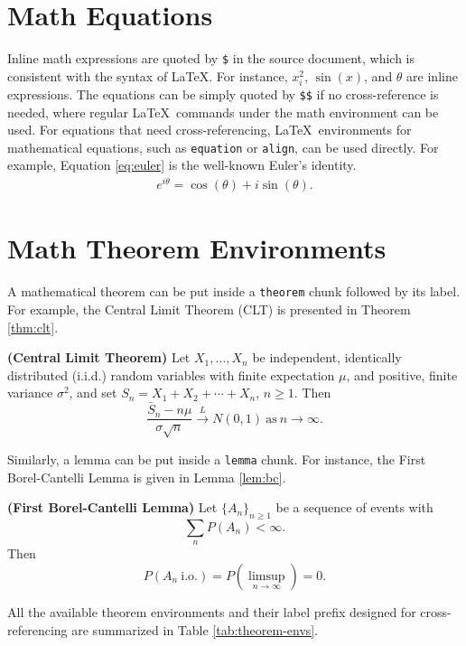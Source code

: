 \documentclass[11pt,letterpaper,]{article}
\theoremstyle{definition}
\theoremstyle{definition}
\theoremstyle{definition}
\theoremstyle{remark}
\let\BeginKnitrBlock\begin \let\EndKnitrBlock\end
\begin{document}
\hypertarget{sec:math}{%
\section{Math Equations}\label{sec:math}}

Inline math expressions are quoted by \texttt{\$} in the source
document, which is consistent with the syntax of \LaTeX. For instance,
\(x_i^2\), \(\sin(x)\), and \(\theta\) are inline expressions. The
equations can be simply quoted by \texttt{\$\$} if no cross-reference is
needed, where regular \LaTeX~commands under the math environment can be
used. For equations that need cross-referencing, \LaTeX~environments for
mathematical equations, such as \texttt{equation} or \texttt{align}, can
be used directly. For example, Equation \eqref{eq:euler} is the well-known
Euler's identity. \begin{align}
    e^{i\theta} = \cos(\theta) + i \sin(\theta).
    \label{eq:euler}
\end{align}

\hypertarget{sec:theorem}{%
\section{Math Theorem Environments}\label{sec:theorem}}

A mathematical theorem can be put inside a \texttt{theorem} chunk
followed by its label. For example, the Central Limit Theorem (CLT) is
presented in Theorem \ref{thm:clt}.

\BeginKnitrBlock{theorem}
\protect\hypertarget{thm:clt}{}{\label{thm:clt} }\textbf{(Central Limit
Theorem)} Let \(X_1,\ldots,X_n\) be independent, identically distributed
(i.i.d.) random variables with finite expectation \(\mu\), and positive,
finite variance \(\sigma^2\), and set \(S_n=X_1 + X_2 + \cdots + X_n\),
\(n \ge 1\). Then \[
    \frac{\bar{S}_n - n\mu}{\sigma \sqrt{n}}\xrightarrow{L} N(0, 1)
    ~\mathrm{as}~n\rightarrow\infty.
\]
\EndKnitrBlock{theorem}

Similarly, a lemma can be put inside a \texttt{lemma} chunk. For
instance, the First Borel-Cantelli Lemma is given in Lemma \ref{lem:bc}.

\BeginKnitrBlock{lemma}
\protect\hypertarget{lem:bc}{}{\label{lem:bc} }\textbf{(First Borel-Cantelli
Lemma)} Let \(\{A_n\}_{n \ge 1}\) be a sequence of events with \[
    \sum_n P(A_n) < \infty.
\] Then \[
P(A_n~\mathrm{i.o.}) = P(\limsup\limits_{n\rightarrow\infty}) = 0.
\]
\EndKnitrBlock{lemma}

All the available theorem environments and their label prefix designed
for cross-referencing are summarized in Table \ref{tab:theorem-envs}.
\end{document}
